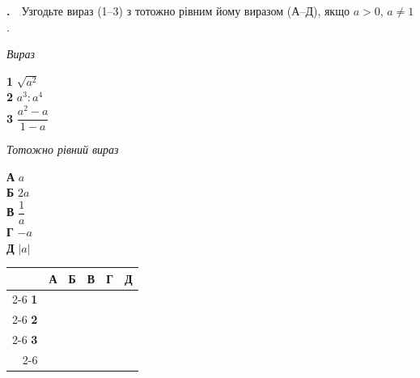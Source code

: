 \documentclass[12pt]{article}
\newcommand{\matchingGrid}{%
    \begingroup
    \renewcommand{\arraystretch}{1.15}
    \setlength{\tabcolsep}{4pt}
    \footnotesize
    \begin{tabular}{r|c|c|c|c|c|}
         \multicolumn{1}{c}{} & \multicolumn{1}{c}{\textbf{А}} & \multicolumn{1}{c}{\textbf{Б}} & \multicolumn{1}{c}{\textbf{В}} & \multicolumn{1}{c}{\textbf{Г}} & \multicolumn{1}{c}{\textbf{Д}} \\ \cline{2-6}
         \textbf{1} & \phantom{X} & \phantom{X} & \phantom{X} & \phantom{X} & \phantom{X} \\ \cline{2-6}
         \textbf{2} & & & & & \\ \cline{2-6}
         \textbf{3} & & & & & \\ \cline{2-6}
    \end{tabular}
    \endgroup
}
\newcounter{zad}
\newcommand{\zadtask}[1]{\stepcounter{zad}\par\vspace{0.3cm}\noindent\textbf{\thezad.}\ \ #1\par\vspace{0.2cm}}
\begin{document}
\zadtask{Узгодьте вираз (1--3) з тотожно рівним йому виразом (А--Д), якщо $a > 0$, $a \neq 1$.\par
\vspace{0.3cm}
\noindent
\begin{minipage}[t]{0.42\textwidth}
\textit{Вираз}\par\vspace{0.15cm}
\textbf{1} \quad $\sqrt{a^2}$\\[0.35cm]
\textbf{2} \quad $a^3 : a^4$\\[0.35cm]
\textbf{3} \quad $\dfrac{a^2 - a}{1 - a}$
\end{minipage}%
\hfill
\begin{minipage}[t]{0.3\textwidth}
\textit{Тотожно рівний вираз}\par\vspace{0.15cm}
\textbf{А} \quad $a$\\[0.15cm]
\textbf{Б} \quad $2a$\\[0.15cm]
\textbf{В} \quad $\dfrac{1}{a}$\\[0.15cm]
\textbf{Г} \quad $-a$\\[0.15cm]
\textbf{Д} \quad $|a|$
\end{minipage}%
\hfill
\begin{minipage}[t]{0.2\textwidth}
\vspace{0.4cm}
\begin{flushright}\matchingGrid\end{flushright}
\end{minipage}}
\end{document}

